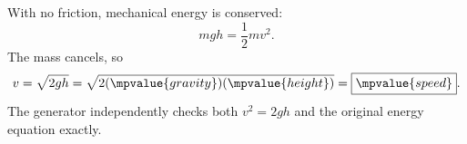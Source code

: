 With no friction, mechanical energy is conserved:
\[
  mgh=\frac12mv^2.
\]
The mass cancels, so
\[
  v=\sqrt{2gh}
   =\sqrt{2(\mpvalue{gravity})(\mpvalue{height})}
   =\boxed{\mpvalue{speed}}.
\]
The generator independently checks both $v^2=2gh$ and the original energy equation exactly.
